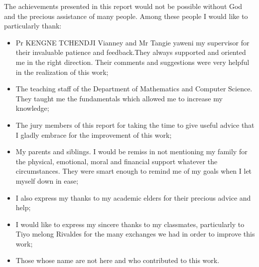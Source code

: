 The achievements presented in this report would not be possible without God and the precious assistance of many people. Among these people I would like to particularly thank:
\begin{itemize} 

 \item  Pr KENGNE TCHENDJI Vianney and Mr Tangie yaweni my supervisor for their invaluable patience and feedback.They always supported and oriented me in the right direction. Their comments and suggestions were very helpful in the realization of this work;
 \item  The teaching staff of the Department of Mathematics and Computer Science.
They taught me the fundamentals which allowed me to increase my knowledge;
 \item  The jury members of this report for taking the time to give useful advice that
I gladly embrace for the improvement of this work;
 \item  My parents and siblings. I would be remiss in not mentioning my family
for the physical, emotional, moral and financial support whatever the circumstances. They were smart enough to remind me of my goals when I let myself
down in ease;
 \item  I also express my thanks to my academic elders for their precious advice and help;
 \item  I would like to express my sincere thanks to my classmates, particularly to Tiyo melong Rivaldes for the many exchanges we had in order to improve this work;
 \item Those whose name are not here and who contributed to this work.
\end{itemize}
\myCleanStarChapterEnd
